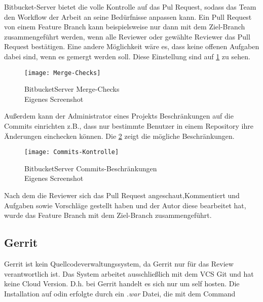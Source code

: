 Bitbucket-Server bietet die volle Kontrolle auf das Pul Request, sodass das Team den Workflow der Arbeit an seine Bedürfnisse anpassen kann. Ein Pull Request von einem Feature Branch kann beispielsweise nur dann mit dem Ziel-Branch zusammengeführt werden, wenn alle Reviewer oder gewählte Reviewer das Pull Request bestätigen. Eine andere Möglichkeit wäre es, dass keine offenen Aufgaben dabei sind, wenn es gemergt werden soll. Diese Einstellung sind auf \cref{fig:BitbucketServer Merge-Checks} zu sehen.
\begin{figure}[H]
	\centering
	\texttt{[image: Merge-Checks]}
	\caption[BitbucketServer Merge-Checks]{BitbucketServer Merge-Checks\\Eigenes Screenshot}
	\label{fig:BitbucketServer Merge-Checks}
\end{figure}

Außerdem kann der Administrator eines Projekts Beschränkungen auf die Commits einrichten z.B., dass nur bestimmte Benutzer in einem Repository ihre Änderungen einchecken können. Die \ref{fig:BitbucketServer Commits-Kontrolle} zeigt die mögliche Beschränkungen.

\begin{figure}[H]
	\centering
	\texttt{[image: Commits-Kontrolle]}
	\caption[BitbucketServer Commits-Beschränkungen]{BitbucketServer Commits-Beschränkungen\\Eigenes Screenshot}
	\label{fig:BitbucketServer Commits-Kontrolle}
\end{figure}

Nach dem die Reviewer sich das Pull Request angeschaut,Kommentiert und Aufgaben sowie Vorschläge gestellt haben und der Autor diese bearbeitet hat, wurde das Feature Branch mit dem Ziel-Branch zusammengeführt.


\subsection{Gerrit}
\label{subsubsec:Test_Gerrit}

Gerrit ist kein Quellcodeverwaltungssystem, da Gerrit nur für das Review verantwortlich ist. Das System arbeitet ausschließlich mit dem \ac{VCS} Git und hat keine Cloud Version. D.h. bei Gerrit handelt es sich nur um self hosten. Die Installation auf odin erfolgte durch ein \textit{.war} Datei, die mit dem Command

